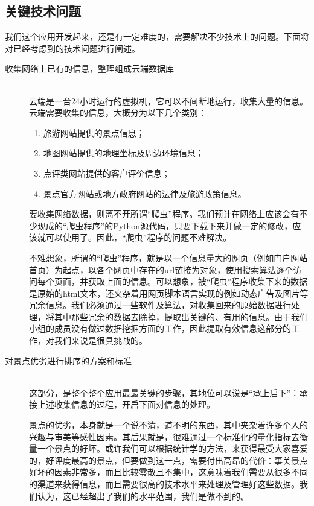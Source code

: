 \documentclass[12pt,a4paper]{article}
\begin{document}
\begin{CJK}{UTF8}{gbsn}
	\subsection{关键技术问题}
	我们这个应用开发起来，还是有一定难度的，需要解决不少技术上的问题。下面将对已经考虑到的技术问题进行阐述。
	
	\begin{description}
	\item[收集网络上已有的信息，整理组成云端数据库] \hfill \\
	云端是一台24小时运行的虚拟机，它可以不间断地运行，收集大量的信息。云端需要收集的信息，大概分为以下几个类别：
		\begin{enumerate}
		\item	旅游网站提供的景点信息；
		\item	地图网站提供的地理坐标及周边环境信息；
		\item	点评类网站提供的客户评价信息；
		\item	景点官方网站或地方政府网站的法律及旅游政策信息。
		\end{enumerate}
	
	要收集网络数据，则离不开所谓“爬虫”程序。我们预计在网络上应该会有不少现成的“爬虫程序”的Python源代码，只要下载下来并做一定的修改，应该就可以使用了。因此，“爬虫”程序的问题不难解决。

	不难想象，所谓的“爬虫”程序，就是以一个信息量大的网页（例如门户网站首页）为起点，以各个网页中存在的url链接为对象，使用搜索算法逐个访问每个页面，并获取上面的信息。可以想象，被“爬虫”程序收集下来的数据是原始的html文本，还夹杂着用网页脚本语言实现的例如动态广告及图片等冗余信息。我们必须通过一些软件及算法，对收集回来的原始数据进行处理，将其中那些冗余的数据去除掉，提取出关键的、有用的信息。由于我们小组的成员没有做过数据挖掘方面的工作，因此提取有效信息这部分的工作，对我们来说是很具挑战的。
	
	\item[对景点优劣进行排序的方案和标准] \hfill \\
	这部分，是整个整个应用最最关键的步骤，其地位可以说是“承上启下”：承接上述收集信息的过程，开启下面对信息的处理。
	
	景点的优劣，本身就是一个说不清，道不明的东西，其中夹杂着许多个人的兴趣与审美等感性因素。其后果就是，很难通过一个标准化的量化指标去衡量一个景点的好坏。或许我们可以根据统计学的方法，来获得最受大家喜爱的，好评度最高的景点，但要做到这一点，需要付出高昂的代价：事关景点好坏的因素非常多，而且比较零散且不集中，这意味着我们需要从很多不同的渠道来获得信息，而且需要很高的技术水平来处理及管理好这些数据。我们认为，这已经超出了我们的水平范围，我们是做不到的。


\end{description}
\end{CJK}
\end{document}
